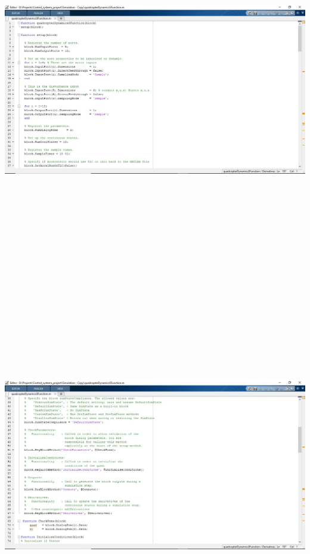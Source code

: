 \documentclass[9pt]{article}
\begin{document}
\begin{flushleft}

\includegraphics[width=175mm,height=165mm]{18.jpg}
\newpage
\includegraphics[width=175mm,height=165mm]{19.jpg}

\end{flushleft}
\end{document}
